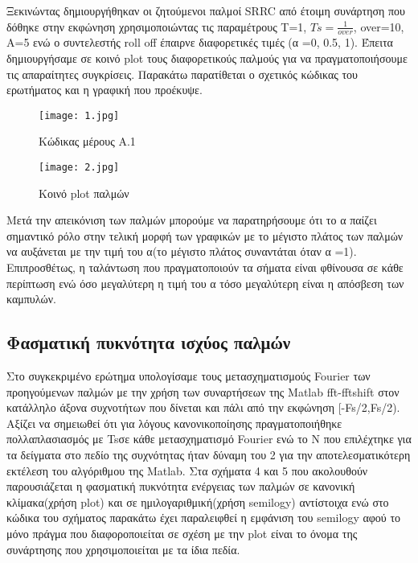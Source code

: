 \documentclass[11pt]{article}
\newcommand{\np}{\newpage}	%
\begin{document}
Ξεκινώντας δημιουργήθηκαν οι ζητούμενοι παλμοί \foreignlanguage{english}{SRRC} από έτοιμη συνάρτηση που δόθηκε στην εκφώνηση χρησιμοποιώντας τις παραμέτρους T=1, \foreignlanguage{english}{$Ts = \frac{1}{over}$, over=10, A=5} ενώ ο συντελεστής \foreignlanguage{english}{roll off} έπαιρνε διαφορετικές τιμές (α =0, 0.5, 1). Έπειτα δημιουργήσαμε σε κοινό \foreignlanguage{english}{plot} τους διαφορετικούς παλμούς για να πραγματοποιήσουμε τις απαραίτητες συγκρίσεις. Παρακάτω παρατίθεται ο σχετικός κώδικας του  ερωτήματος και η γραφική που προέκυψε.

\begin{figure}[ht]
  \centering
  \begin{minipage}{0.45\textwidth}
    \texttt{[image: 1.jpg]}
    \caption{Κώδικας μέρους Α.1}
  \end{minipage}
  \hfill
  \begin{minipage}{0.5\textwidth}
    \texttt{[image: 2.jpg]}
    \caption{Κοινό \foreignlanguage{english}{plot} παλμών }
  \end{minipage}
\end{figure}

Μετά την απεικόνιση των παλμών μπορούμε να παρατηρήσουμε ότι το α παίζει σημαντικό ρόλο στην τελική μορφή των γραφικών με το μέγιστο πλάτος των παλμών να αυξάνεται με την τιμή του α(το μέγιστο πλάτος συναντάται όταν α =1). Επιπροσθέτως, η ταλάντωση που πραγματοποιούν τα σήματα είναι φθίνουσα σε κάθε περίπτωση ενώ όσο μεγαλύτερη η τιμή του α τόσο μεγαλύτερη είναι η απόσβεση των καμπυλών. 

\np

\subsection{Φασματική πυκνότητα ισχύος παλμών}

Στο συγκεκριμένο ερώτημα υπολογίσαμε τους μετασχηματισμούς \foreignlanguage{english}{Fourier} των προηγούμενων παλμών με την χρήση των συναρτήσεων της \foreignlanguage{english}{Matlab fft-fftshift} στον κατάλληλο άξονα συχνοτήτων που δίνεται και πάλι από την εκφώνηση [\foreignlanguage{english}{-Fs}/2,\foreignlanguage{english}{Fs}/2). Αξίζει να σημειωθεί ότι για λόγους κανονικοποίησης πραγματοποιήθηκε πολλαπλασιασμός με \foreignlanguage{english}{Ts}σε κάθε μετασχηματισμό \foreignlanguage{english}{Fourier} ενώ το N που επιλέχτηκε για τα δείγματα στο πεδίο της συχνότητας ήταν δύναμη του 2 για την αποτελεσματικότερη εκτέλεση του αλγόριθμου της \foreignlanguage{english}{Matlab}. Στα σχήματα 4 και 5 που ακολουθούν παρουσιάζεται η φασματική πυκνότητα ενέργειας των παλμών σε κανονική κλίμακα(χρήση  \foreignlanguage{english}{plot}) και σε ημιλογαριθμική(χρήση \foreignlanguage{english}{semilogy}) αντίστοιχα ενώ στο κώδικα του σχήματος παρακάτω έχει παραλειφθεί η εμφάνιση του \foreignlanguage{english}{semilogy} αφού το μόνο πράγμα που διαφοροποιείται σε σχέση με την \foreignlanguage{english}{plot} είναι το όνομα της συνάρτησης που χρησιμοποιείται με τα ίδια πεδία.
\end{document}
